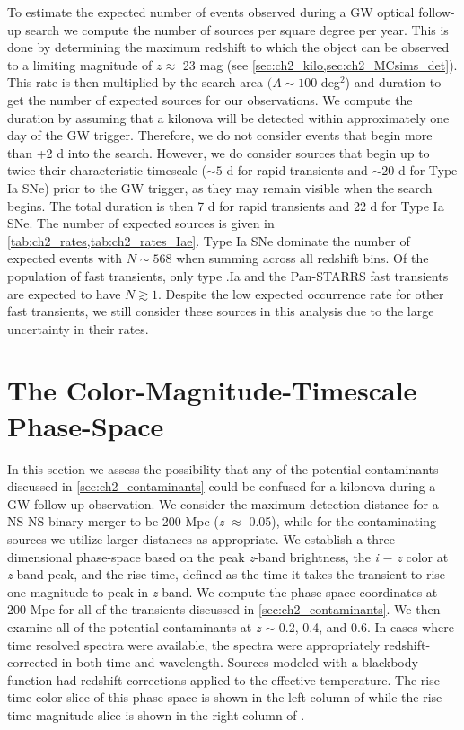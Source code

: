 To estimate the expected number of events observed during a GW optical follow-up search we compute the number of sources per square degree per year. This is done by determining the maximum redshift to which the object can be observed to a limiting magnitude of $z \approx$ 23 mag (see \cref{sec:ch2_kilo,sec:ch2_MCsims_det}). This rate is then multiplied by the search area $(A \sim 100$ deg$^2$) and duration to get the number of expected sources for our observations. We compute the duration by assuming that a kilonova will be detected within approximately one day of the GW trigger. Therefore, we do not consider events that begin more than +2 d into the search. However, we do consider sources that begin up to twice their characteristic timescale ($\sim5$ d for rapid transients and $\sim 20$ d for Type Ia SNe) prior to the GW trigger, as they may remain visible when the search begins. The total duration is then 7 d for rapid transients and 22 d for Type Ia SNe. The number of expected sources is given in \cref{tab:ch2_rates,tab:ch2_rates_Iae}. Type Ia SNe dominate the number of expected events with $N \sim 568$ when summing across all redshift bins. Of the population of fast transients, only type .Ia and the Pan-STARRS fast transients are expected to have $N \gtrsim 1$. Despite the low expected occurrence rate for other fast transients, we still consider these sources in this analysis due to the large uncertainty in their rates.

\section{The Color-Magnitude-Timescale Phase-Space}
\label{sec:ch2_phase}
In this section we assess the possibility that any of the potential contaminants discussed in \cref{sec:ch2_contaminants} could be confused  for a kilonova during a GW follow-up observation. We consider the maximum detection distance for a NS-NS binary merger to be 200 Mpc ({\em z} $\approx$ 0.05), while for the contaminating sources we utilize larger distances as appropriate. We establish a three-dimensional phase-space based on the peak {\em z}-band brightness, the {\em i} $-$ {\em z} color at {\em z}-band peak, and the rise time, defined as the time it takes the transient to rise one magnitude to peak in {\em z}-band. We compute the phase-space coordinates at 200 Mpc for all of the transients discussed in \cref{sec:ch2_contaminants}. We then examine all of the potential contaminants at {\em z} $\sim$ 0.2, 0.4, and 0.6. In cases where time resolved spectra were available, the spectra were appropriately redshift-corrected in both time and wavelength. Sources modeled with a blackbody function had redshift corrections applied to the effective temperature. The rise time-color slice of this phase-space is shown in the left column of  while the rise time-magnitude slice is shown in the right column of .

